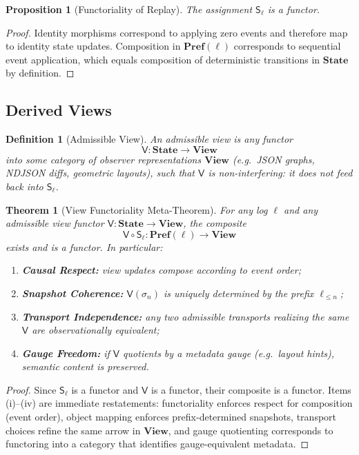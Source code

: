 \documentclass[11pt]{article}
\newtheorem{definition}{Definition}[section]
\newtheorem{proposition}{Proposition}[section]
\newtheorem{theorem}{Theorem}[section]
\begin{document}
\begin{proposition}[Functoriality of Replay]
The assignment $\mathsf{S}_\ell$ is a functor.
\end{proposition}

\begin{proof}
Identity morphisms correspond to applying zero events and therefore map to identity state updates. Composition in $\mathbf{Pref}(\ell)$ corresponds to sequential event application, which equals composition of deterministic transitions in $\mathbf{State}$ by definition.
\end{proof}

\subsection{Derived Views}

\begin{definition}[Admissible View]
\label{def:admissible-view}
An \emph{admissible view} is any functor
\[
\mathsf{V} : \mathbf{State} \to \mathbf{View}
\]
into some category of observer representations $\mathbf{View}$ (e.g.\ JSON graphs, NDJSON diffs, geometric layouts), such that $\mathsf{V}$ is \emph{non-interfering}: it does not feed back into $\mathsf{S}_\ell$.
\end{definition}

\begin{theorem}[View Functoriality Meta-Theorem]
\label{thm:view-functoriality}
For any log $\ell$ and any admissible view functor $\mathsf{V}:\mathbf{State}\to\mathbf{View}$, the composite
\[
\mathsf{V}\circ\mathsf{S}_\ell : \mathbf{Pref}(\ell) \to \mathbf{View}
\]
exists and is a functor. In particular:
\begin{enumerate}[label=(\roman*)]
\item \textbf{Causal Respect:} view updates compose according to event order;
\item \textbf{Snapshot Coherence:} $\mathsf{V}(\sigma_n)$ is uniquely determined by the prefix $\ell_{\le n}$;
\item \textbf{Transport Independence:} any two admissible transports realizing the same $\mathsf{V}$ are observationally equivalent;
\item \textbf{Gauge Freedom:} if $\mathsf{V}$ quotients by a metadata gauge (e.g.\ layout hints), semantic content is preserved.
\end{enumerate}
\end{theorem}

\begin{proof}
Since $\mathsf{S}_\ell$ is a functor and $\mathsf{V}$ is a functor, their composite is a functor. Items (i)--(iv) are immediate restatements: functoriality enforces respect for composition (event order), object mapping enforces prefix-determined snapshots, transport choices refine the same arrow in $\mathbf{View}$, and gauge quotienting corresponds to functoring into a category that identifies gauge-equivalent metadata.
\end{proof}
\end{document}
